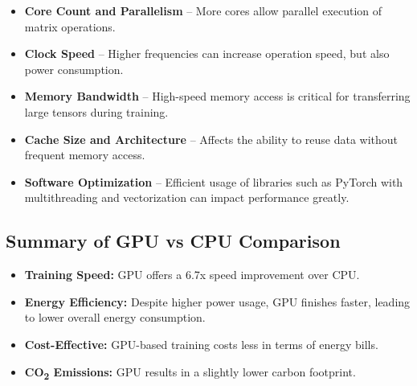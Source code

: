 \begin{itemize}
    \item \textbf{Core Count and Parallelism} – More cores allow parallel execution of matrix 
    operations. %

    \item \textbf{Clock Speed} – Higher frequencies can increase operation speed, but also power 
    consumption. %

    \item \textbf{Memory Bandwidth} – High-speed memory access is critical for transferring large 
    tensors during training. %

    \item \textbf{Cache Size and Architecture} – Affects the ability to reuse data without frequent 
    memory access. %

    \item \textbf{Software Optimization} – Efficient usage of libraries such as PyTorch with 
    multithreading and vectorization can impact performance greatly. 
\end{itemize}


\subsection{Summary of GPU vs CPU Comparison}

\begin{itemize}
    \item \textbf{Training Speed:} GPU offers a 6.7x speed improvement over CPU.
    \item \textbf{Energy Efficiency:} Despite higher power usage, GPU finishes faster, leading to 
    lower overall energy consumption.
    \item \textbf{Cost-Effective:} GPU-based training costs less in terms of energy bills.
    \item \textbf{CO\textsubscript{2} Emissions:} GPU results in a slightly lower carbon footprint.
\end{itemize}